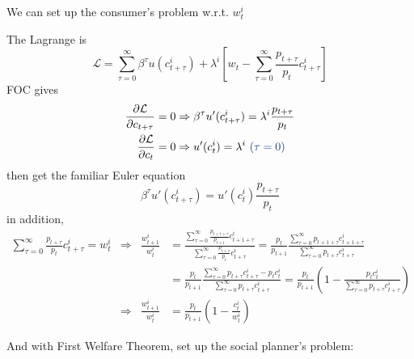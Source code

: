 \documentclass[10pt,landscape,a4paper]{article}
\begin{document}
\begin{multicols*}{3}
We can set up the consumer's problem w.r.t. $w_t^i$

\vspace{2pt}
The Lagrange is
$$
\mathcal{L}= \sum^{\infty}_{\tau=0}\beta^{\tau} u(c^i_{t+\tau}) + \lambda^i\left[ w_t -\sum^{\infty}_{\tau=0}\frac{p_{t+\tau}}{p_t}c_{t+\tau}^i \right]
$$
FOC gives
\begin{align*}
    \frac{\partial \mathcal{L}}{\partial c_{t+\tau}}=0 & \Rightarrow \beta^{\tau} u'(c^i_{t+\tau}) = \lambda^i \frac{p_{t+\tau}}{p_t}\\
    \frac{\partial \mathcal{L}}{\partial c_t}=0 & \Rightarrow u'(c^i_t) = \lambda^i\ {\color{myblue}(\tau =0)}
\end{align*}
then get the familiar Euler equation
$$
\beta^{\tau}u'(c^i_{t+\tau}) = u'(c_t^i) \frac{p_{t+\tau}}{p_t}
$$
in addition,
\begin{align*}
    \sum^{\infty}_{\tau=0}\frac{p_{t+\tau}}{p_t}c_{t+\tau}^i = w_t^i &\Rightarrow & \frac{w_{t+1}^i}{w_t^i} &= \frac{\sum^{\infty}_{\tau=0}\frac{p_{t+1+\tau}}{p_{t+1}}c_{t+1+\tau}^i}{\sum^{\infty}_{\tau=0}\frac{p_{t+\tau}}{p_t}c_{t+\tau}^i} = \frac{p_t}{p_{t+1}}\frac{\sum^{\infty}_{\tau=0}p_{t+1+\tau}c_{t+1+\tau}^i}{\sum^{\infty}_{\tau=0}p_{t+\tau}c_{t+\tau}^i}\\
    & & & = \frac{p_t}{p_{t+1}}\frac{\sum^{\infty}_{\tau=0}p_{t+\tau}c_{t+\tau}^i-p_tc_t^i}{\sum^{\infty}_{\tau=0}p_{t+\tau}c_{t+\tau}^i} = \frac{p_t}{p_{t+1}}\left(1- \frac{p_tc_t^i}{\sum^{\infty}_{\tau=0}p_{t+\tau}c_{t+\tau}^i}\right)\\
    & \Rightarrow &  \frac{w_{t+1}^i}{w_t^i}& = \frac{p_t}{p_{t+1}}\left(1-\frac{c_t^i}{w_t^i}\right)
\end{align*}

And with First Welfare Theorem, set up the social planner's problem:


\end{multicols*}
\end{document}
